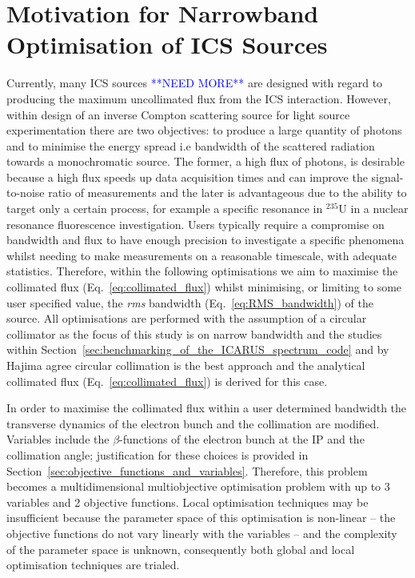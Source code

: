 \documentclass[../main.tex]{subfiles}
\begin{document}
\section{Motivation for Narrowband Optimisation of ICS Sources}
\label{sec:motivation_optimisation}

Currently, many ICS sources \cite{deitrick2017inverse,deitrick2018high} \textcolor{blue}{**NEED MORE**} are designed with regard to producing the maximum uncollimated flux from the ICS interaction. However, within design of an inverse Compton scattering source for light source experimentation there are two objectives: to produce a large quantity of photons and to minimise the energy spread i.e bandwidth of the scattered radiation towards a monochromatic source. The former, a high flux of photons, is desirable because a high flux speeds up data acquisition times and can improve the signal-to-noise ratio of measurements and the later is advantageous due to the ability to target only a certain process, for example a specific resonance in $^{235}\mathrm{U}$ in a nuclear resonance fluorescence investigation. Users typically require a compromise on bandwidth and flux to have enough precision to investigate a specific phenomena whilst needing to make measurements on a reasonable timescale, with adequate statistics. Therefore, within the following optimisations we aim to maximise the collimated flux (Eq.~\ref{eq:collimated_flux}) whilst minimising, or limiting to some user specified value, the \textit{rms} bandwidth (Eq.~\ref{eq:RMS_bandwidth}) of the source. All optimisations are performed with the assumption of a circular collimator as the focus of this study is on narrow bandwidth and the studies within Section~\ref{sec:benchmarking_of_the_ICARUS_spectrum_code} and by Hajima \cite{hajima2021bandwidth} agree circular collimation is the best approach and the analytical collimated flux (Eq.~\ref{eq:collimated_flux}) is derived for this case.

In order to maximise the collimated flux within a user determined bandwidth the transverse dynamics of the electron bunch and the collimation are modified. Variables include the $\beta$-functions of the electron bunch at the IP and the collimation angle; justification for these choices is provided in Section~\ref{sec:objective_functions_and_variables}. Therefore, this problem becomes a multidimensional multiobjective optimisation problem with up to 3 variables and 2 objective functions. Local optimisation techniques may be insufficient because the parameter space of this optimisation is non-linear -- the objective functions do not vary linearly with the variables -- and the complexity of the parameter space is unknown, consequently both global and local optimisation techniques are trialed.
\end{document}
